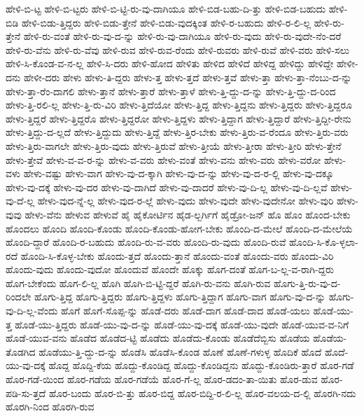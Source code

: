 {ಹೇಳಿ-ಬಿ-ಟ್ಟ
ಹೇಳಿ-ಬಿ-ಟ್ಟರು
ಹೇಳಿ-ಬಿ-ಟ್ಟಿ-ರು-ವು-ದಾಗಿಯೂ
ಹೇಳಿ-ಬಿಡ-ಬಹು-ದಿ-ತ್ತು
ಹೇಳಿ-ಬಿಡ-ಬಹುದು
ಹೇಳಿ-ಬಿಡಿ
ಹೇಳಿ-ಬಿಡು-ತ್ತಿದ್ದರು
ಹೇಳಿ-ಬಿಡು-ತ್ತೇನೆ
ಹೇಳಿ-ಬಿಡು-ವುದಕ್ಕಿಂತ
ಹೇಳಿ-ರ-ಬಹುದು
ಹೇಳಿ-ರ-ಲಿ-ಲ್ಲ
ಹೇಳಿ-ರು-ತ್ತೇನೆ
ಹೇಳಿ-ರು-ವಂತೆ
ಹೇಳಿ-ರು-ವು-ದ-ನ್ನು
ಹೇಳಿ-ರು-ವು-ದಾಗಿಯೂ
ಹೇಳಿ-ರು-ವುದು
ಹೇಳಿ-ರು-ವುದೇ-ನೆಂ-ದರೆ
ಹೇಳಿ-ರು-ವೆನು
ಹೇಳಿ-ರು-ವೆವು
ಹೇಳಿ-ರುವ
ಹೇಳಿ-ರುವ-ರೆಂದು
ಹೇಳಿ-ರುವರು
ಹೇಳಿ-ರುವೆ
ಹೇಳಿ-ವರು
ಹೇಳಿ-ಸಲು
ಹೇಳಿ-ಸಿ-ಕೊಂಡ-ವ-ನ-ಲ್ಲ
ಹೇಳಿ-ಸಿ-ದರು
ಹೇಳಿ-ಹೋದ
ಹೇಳಿತು
ಹೇಳಿದ
ಹೇಳಿದೆ
ಹೇಳಿದ್ದ
ಹೇಳಿದ್ದು
ಹೇಳಿದ್ದೇ
ಹೇಳೀ-ದನು
ಹೇಳೀ-ದರು
ಹೇಳು
ಹೇಳು-ತಿ-ದ್ದರು
ಹೇಳು-ತ್ತ
ಹೇಳು-ತ್ತದೆ
ಹೇಳು-ತ್ತವೆ
ಹೇಳು-ತ್ತಾ
ಹೇಳು-ತ್ತಾ-ನೆಂಬು-ದ-ನ್ನು
ಹೇಳು-ತ್ತಾ-ರೆಂ-ದಾಗಲಿ
ಹೇಳು-ತ್ತಾನೆ
ಹೇಳು-ತ್ತಾರೆ
ಹೇಳು-ತ್ತಾಳೆ
ಹೇಳು-ತ್ತಿ-ದ್ದು-ದ-ನ್ನು
ಹೇಳು-ತ್ತಿ-ದ್ದು-ದ-ರಿಂದ
ಹೇಳು-ತ್ತಿ-ರಲಿ-ಲ್ಲ
ಹೇಳು-ತ್ತಿ-ರು-ವಿರಿ
ಹೇಳು-ತ್ತಿದೆಯೋ
ಹೇಳು-ತ್ತಿದ್ದ
ಹೇಳು-ತ್ತಿದ್ದನು
ಹೇಳು-ತ್ತಿದ್ದರು
ಹೇಳು-ತ್ತಿದ್ದರೂ
ಹೇಳು-ತ್ತಿದ್ದರೆ
ಹೇಳು-ತ್ತಿದ್ದರೊ
ಹೇಳು-ತ್ತಿದ್ದರೋ
ಹೇಳು-ತ್ತಿದ್ದಳು
ಹೇಳು-ತ್ತಿದ್ದಾಗ
ಹೇಳು-ತ್ತಿದ್ದಾರೆ
ಹೇಳು-ತ್ತಿದ್ದೀ-ರೇನು
ಹೇಳು-ತ್ತಿದ್ದು-ದ-ಲ್ಲದೆ
ಹೇಳು-ತ್ತಿದ್ದುದು
ಹೇಳು-ತ್ತಿದ್ದೆ
ಹೇಳು-ತ್ತಿರ-ಬೇಕು
ಹೇಳು-ತ್ತಿರು-ವ-ರೆಂದೂ
ಹೇಳು-ತ್ತಿರು-ವರು
ಹೇಳು-ತ್ತಿರು-ವಾಗಲೇ
ಹೇಳು-ತ್ತಿರು-ವುದು
ಹೇಳು-ತ್ತಿರುವೆ
ಹೇಳು-ತ್ತೀಯೆ
ಹೇಳು-ತ್ತೀರಾ
ಹೇಳು-ತ್ತೀರಿ
ಹೇಳು-ತ್ತೇನೆ
ಹೇಳು-ತ್ತೇವೆ
ಹೇಳು-ವ-ವ-ರ-ನ್ನು
ಹೇಳು-ವ-ವರು
ಹೇಳು-ವಂತೆ
ಹೇಳು-ವನು
ಹೇಳು-ವರು
ಹೇಳು-ವರೋ
ಹೇಳು-ವಳು
ಹೇಳು-ವಷ್ಟು
ಹೇಳು-ವಾಗ
ಹೇಳು-ವು-ದ-ಕ್ಕಾಗಿ
ಹೇಳು-ವು-ದ-ನ್ನು
ಹೇಳು-ವು-ದ-ರ-ಲ್ಲಿ
ಹೇಳು-ವು-ದಕ್ಕೂ
ಹೇಳು-ವು-ದಕ್ಕೆ
ಹೇಳು-ವು-ದರ
ಹೇಳು-ವು-ದಾಗಿದೆ
ಹೇಳು-ವು-ದಾದರೆ
ಹೇಳು-ವು-ದಿ-ಲ್ಲ
ಹೇಳು-ವು-ದಿ-ಲ್ಲವೆ
ಹೇಳು-ವು-ದೆ-ಲ್ಲ
ಹೇಳು-ವುದ-ನ್ನೆ-ಲ್ಲ
ಹೇಳು-ವುದ-ರ-ಲ್ಲೆ
ಹೇಳು-ವುದು
ಹೇಳು-ವುದೇ
ಹೇಳು-ವುದೇನೋ
ಹೇಳು-ವುರಿ
ಹೇಳು-ವುವು
ಹೇಳು-ವೆನು
ಹೇಳುವ
ಹೇಳುವೆ
ಹೈ
ಹೈಕೋರ್ಟಿನ
ಹೈಡ-ಲ್ಬರ್ಗಿಗೆ
ಹೈಡ್ರೋ-ಜನ್
ಹೊ
ಹೊಂ
ಹೊಂದ-ಬೇಕು
ಹೊಂದಲು
ಹೊಂದಿ
ಹೊಂದಿ-ಕೊಂಡು
ಹೊಂದಿ-ಕೊಂಡು-ಹೋಗ-ಬೇಕು
ಹೊಂದಿ-ದ-ಮೇಲೆ
ಹೊಂದಿ-ದ-ಮೇಲೆಯೆ
ಹೊಂದಿ-ದ್ದಾರೆ
ಹೊಂದಿ-ರ-ಬಹುದು
ಹೊಂದಿ-ರು-ವ-ವರು
ಹೊಂದಿ-ರು-ವುದು
ಹೊಂದಿ-ರುವೆ
ಹೊಂದಿ-ಸಿ-ಕೊ-ಳ್ಳಲಾ-ರದೆ
ಹೊಂದಿ-ಸಿ-ಕೊಳ್ಳ-ಬೇಕು
ಹೊಂದು-ತ್ತದೆ
ಹೊಂದು-ತ್ತಾನೆ
ಹೊಂದು-ವಂತೆ
ಹೊಂದು-ವರು
ಹೊಂದು-ವಿರಿ
ಹೊಂದು-ವುದು
ಹೊಂದು-ವುದೋ
ಹೊಂದುವೆ
ಹೊಂದೇ
ಹೊಕ್ಕು
ಹೊಗ-ದಂತೆ
ಹೊಗ-ಬ-ಲ್ಲ-ವ-ರಾಗಿ-ದ್ದರು
ಹೊಗ-ಬೇಕೆಂದು
ಹೊಗ-ಲಿ-ಲ್ಲ
ಹೊಗಿ
ಹೊಗಿ-ಬಿ-ಟ್ಟಿ-ದ್ದರೆ
ಹೊಗಿ-ರು-ವನು
ಹೊಗಿ-ರುವ
ಹೊಗು-ತ್ತಿ-ರು-ವು-ದ-ರಿಂದಲೇ
ಹೊಗು-ತ್ತಿದ್ದ
ಹೊಗು-ತ್ತಿದ್ದರು
ಹೊಗು-ತ್ತಿದ್ದಳು
ಹೊಗು-ತ್ತಿದ್ದಾಗ
ಹೊಗು-ವಾಗ
ಹೊಗು-ವು-ದ-ನ್ನು
ಹೊಗು-ವು-ದಿ-ಲ್ಲ-ವೆಂದು
ಹೊಗೆ
ಹೊಗೆ-ಸೊಪ್ಪ-ನ್ನು
ಹೊಡೆ-ದರು
ಹೊಡೆ-ದಾಗ
ಹೊಡೆ-ದಾದ
ಹೊಡೆ-ಯಲು
ಹೊಡೆ-ಯು-ತ್ತ
ಹೊಡೆ-ಯು-ತ್ತಿದ್ದರು
ಹೊಡೆ-ಯು-ವು-ದ-ನ್ನು
ಹೊಡೆ-ಯು-ವು-ದಕ್ಕೆ
ಹೊಡೆ-ಯು-ವುದೇ
ಹೊಡೆ-ಯುವ-ವ-ನಿಗೆ
ಹೊಡೆ-ಯುವ-ವನು
ಹೊಡೆದ
ಹೊಡೆದ-ಟ್ಟಿ
ಹೊಡೆದು
ಹೊಡೆದು-ಕೊಂಡು
ಹೊಡೆದೆಬ್ಬಿಸು
ಹೊಡೆಯ
ಹೊಡೆಯ-ತೊಡಗಿದ
ಹೊಡೆಯು-ತ್ತಿ-ದ್ದು-ದ-ನ್ನು
ಹೊಡೆಸಿ
ಹೊಡೆಸಿ-ಕೊಂಡ
ಹೊಣೆ
ಹೊಣೆ-ಗಳುಳ್ಳ
ಹೊದಿಕೆ
ಹೊದೆ
ಹೊದೆ-ಯು-ವು-ದಕ್ಕೆ
ಹೊದ್ದ
ಹೊದ್ದಿ-ಕೆಯ
ಹೊದ್ದು-ಕೊಂಡಿದ್ದ
ಹೊದ್ದು-ಕೊಂಡಿದ್ದನು
ಹೊದ್ದು-ಕೊಂಡಿರು-ತ್ತಾರೆ
ಹೊರ-ಗಡೆ
ಹೊರ-ಗಡೆ-ಯಿಂದ
ಹೊರ-ಗಡೆಯ
ಹೊರ-ಗಡೆಯೆ
ಹೊರ-ಗೆ-ಲ್ಲ
ಹೊರ-ಡದಂ-ತಾ-ಯಿತು
ಹೊರ-ಡುವ
ಹೊರ-ಪಡಿ-ಸು-ತ್ತದೆ
ಹೊರ-ಬಂದು
ಹೊರ-ಬಿ-ತ್ತು
ಹೊರ-ಬಿದ್ದ
ಹೊರ-ಬಿದ್ದಿ-ರ-ಲಿ-ಲ್ಲ
ಹೊರ-ವಲಯ-ದ-ಲ್ಲಿ
ಹೊರಗಿ-ನದು
ಹೊರಗಿ-ನಿಂದ
ಹೊರಗಿ-ರುವ
}
